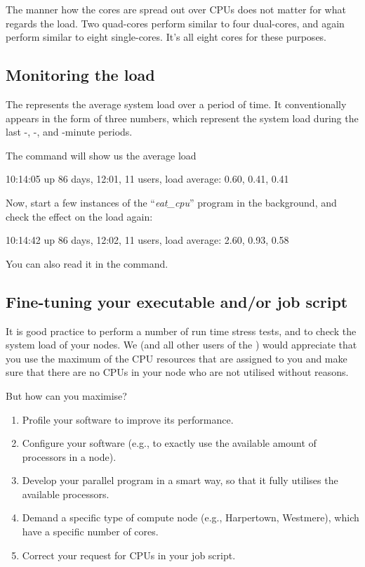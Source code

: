 The manner how the cores are spread out over CPUs does not matter for what
regards the load. Two quad-cores perform similar to four dual-cores, and again
perform similar to eight single-cores. It's all eight cores for these purposes.

\subsection{Monitoring the load}

The  represents the average system load over a period of
time. It conventionally appears in the form of three numbers, which represent
the system load during the last -, -, and
-minute periods.

The  command will show us the average load

\begin{prompt}
10:14:05 up 86 days, 12:01, 11 users, load average: 0.60, 0.41, 0.41
\end{prompt}

Now, start a few instances of the ``\emph{eat\_cpu}'' program in the
background, and check the effect on the load again:

\begin{prompt}
10:14:42 up 86 days, 12:02, 11 users, load average: 2.60, 0.93, 0.58
\end{prompt}

You can also read it in the  command.
\subsection{Fine-tuning your executable and/or job script}

It is good practice to perform a number of run time stress tests, and to check
the system load of your nodes. We (and all other users of the \hpc) would
appreciate that you use the maximum of the CPU resources that are assigned to
you and make sure that there are no CPUs in your node who are not utilised
without reasons.

But how can you maximise?

\begin{enumerate}
\item  Profile your software to improve its performance.
\item  Configure your software (e.g., to exactly use the available amount of processors in a node).
\item  Develop your parallel program in a smart way, so that it fully utilises the available processors.
\item  Demand a specific type of compute node (e.g., Harpertown, Westmere), which have a specific number of cores.
\item  Correct your request for CPUs in your job script.
\end{enumerate}

